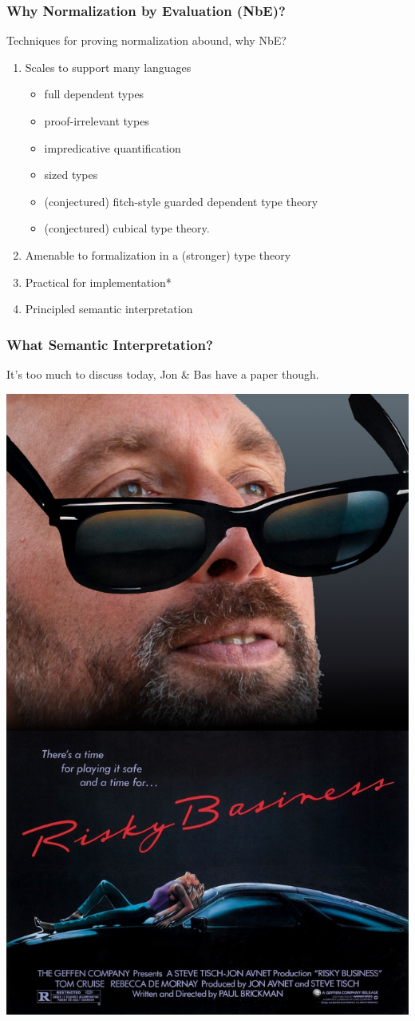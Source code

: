 \documentclass[svgnames]{beamer}
\begin{document}
\begin{frame}
  \frametitle{Why Normalization by Evaluation (NbE)?}
  Techniques for proving normalization abound, why NbE?
  \begin{enumerate}
  \item Scales to support many languages
    \begin{itemize}
    \item full dependent types
    \item proof-irrelevant types
    \item impredicative quantification
    \item sized types
    \item (conjectured) fitch-style guarded dependent type theory
    \item (conjectured) cubical type theory.
    \end{itemize}
  \item Amenable to formalization in a (stronger) type theory
  \item Practical for implementation*
  \item Principled semantic interpretation
  \end{enumerate}
\end{frame}

\begin{frame}
  \frametitle{What Semantic Interpretation?}
  \centering
  It's too much to discuss today, Jon \& Bas have a paper though.
  \bigskip
  \pause

  \includegraphics[width=0.4\linewidth]{photo.jpg}
\end{frame}
\end{document}

